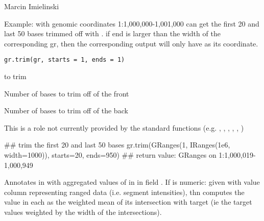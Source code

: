 \documentclass[a4paper]{book}
\begin{document}
%
\begin{Author}\relax
Marcin Imielinski
\end{Author}
%
\begin{Description}\relax
Example:  with genomic coordinates 1:1,000,000-1,001,000 can get the first 20 and last 50 bases trimmed off with
.
if end is larger than the width of the corresponding gr, then the corresponding output will only have  as its coordinate.
\end{Description}
%
\begin{Usage}
\begin{verbatim}
gr.trim(gr, starts = 1, ends = 1)
\end{verbatim}
\end{Usage}
%
\begin{Arguments}
\begin{ldescription}
\item[\code{gr}]  to trim

\item[\code{starts}] Number of bases to trim off of the front\code{[1]}

\item[\code{ends}] Number of bases to trim off of the back\code{[1]}
\end{ldescription}
\end{Arguments}
%
\begin{Details}\relax
This is a role not currently provided by the standard  functions
(e.g. , , , , , )
\end{Details}
%
\begin{Examples}
\begin{ExampleCode}
## trim the first 20 and last 50 bases
gr.trim(GRanges(1, IRanges(1e6, width=1000)), starts=20, ends=950)
## return value: GRanges on 1:1,000,019-1,000,949
\end{ExampleCode}
\end{Examples}
%
\begin{Description}\relax
Annotates  in  with aggregated values of  in  in field .
If  is numeric: given  with value column  representing ranged data
(i.e. segment intensities), thn computes the value
in each   as the weighted mean of its intersection with target
(ie the target values weighted by the width of the intersections).
\end{Description}
\end{document}

